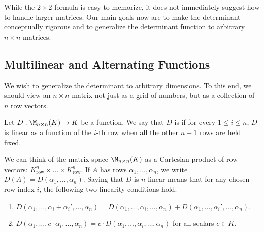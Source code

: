 \begin{goals}\label{goals:determinants}
  While the $2 \times 2$ formula is easy to memorize, it does not immediately suggest how to handle larger matrices. Our main goals now are to make the determinant conceptually rigorous and to generalize the determinant function to arbitrary $n \times n$ matrices.
\end{goals}

\subsection{Multilinear and Alternating Functions}

We wish to generalize the determinant to arbitrary dimensions. To this end, we should view an $n \times n$ matrix not just as a grid of numbers, but as a collection of $n$ row vectors.

\begin{definition}[$n$-Linearity]\label{def:n_linear}
  Let $D : \M_{n \times n}(K) \to K$ be a function. We say that $D$ is  if for every $1 \le i \le n$, $D$ is linear as a function of the $i$-th row when all the other $n-1$ rows are held fixed.
\end{definition}

We can think of the matrix space $\M_{n \times n}(K)$ as a Cartesian product of row vectors: $K^n_{\text{row}} \times \dots \times K^n_{\text{row}}$. If $A$ has rows $\alpha_1, \dots, \alpha_n$, we write $D(A) = D(\alpha_1, \dots, \alpha_n)$.
Saying that $D$ is $n$-linear means that for any chosen row index $i$, the following two linearity conditions hold:
\begin{enumerate}
  \item $D(\alpha_1, \dots, \alpha_i + \alpha_i', \dots, \alpha_n) = D(\alpha_1, \dots, \alpha_i, \dots, \alpha_n) + D(\alpha_1, \dots, \alpha_i', \dots, \alpha_n)$.
  \item $D(\alpha_1, \dots, c \cdot \alpha_i, \dots, \alpha_n) = c \cdot D(\alpha_1, \dots, \alpha_i, \dots, \alpha_n)$ for all scalars $c \in K$.
\end{enumerate}

